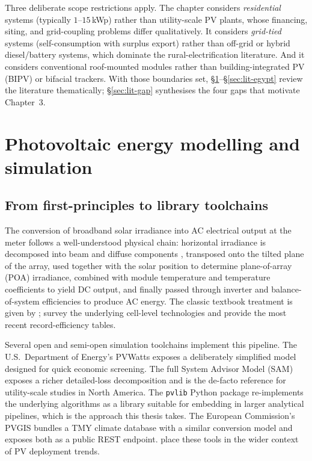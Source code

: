 Three deliberate scope restrictions apply. The chapter considers
\emph{residential} systems (typically $1$--$15$\,kWp) rather than
utility-scale PV plants, whose financing, siting, and grid-coupling
problems differ qualitatively. It considers \emph{grid-tied} systems
(self-consumption with surplus export) rather than off-grid or hybrid
diesel/battery systems, which dominate the rural-electrification
literature. And it considers conventional roof-mounted modules rather
than building-integrated PV (BIPV) or bifacial trackers. With those
boundaries set, \S\ref{sec:lit-pv}--\S\ref{sec:lit-egypt} review the
literature thematically; \S\ref{sec:lit-gap} synthesises the four
gaps that motivate Chapter~3.

\section{Photovoltaic energy modelling and simulation}
\label{sec:lit-pv}

\subsection{From first-principles to library toolchains}
\label{sec:lit-pv-tools}

The conversion of broadband solar irradiance into AC electrical
output at the meter follows a well-understood physical chain:
horizontal irradiance is decomposed into beam and diffuse components
\citep{liu1960}, transposed onto the tilted plane of the array, used
together with the solar position \citep{nrel-spa} to determine
plane-of-array (POA) irradiance, combined with module temperature and
temperature coefficients to yield DC output, and finally passed
through inverter and balance-of-system efficiencies to produce AC
energy. The classic textbook treatment is given by
\citet{duffie}; \citet{parida2011} survey the underlying cell-level
technologies and \citet{green2024} provide the most recent
record-efficiency tables.

Several open and semi-open simulation toolchains implement this
pipeline. The U.S.\ Department of Energy's PVWatts \citep{pvwatts2014}
exposes a deliberately simplified model designed for quick economic
screening. The full System Advisor Model (SAM) \citep{nrel-sam}
exposes a richer detailed-loss decomposition and is the de-facto
reference for utility-scale studies in North America. The
\texttt{pvlib} Python package \citep{pvlib} re-implements the
underlying algorithms as a library suitable for embedding in larger
analytical pipelines, which is the approach this thesis takes. The
European Commission's PVGIS \citep{pvgis} bundles a TMY climate
database with a similar conversion model and exposes both as a public
REST endpoint. \citet{ieapvps-task7} place these tools in the wider
context of PV deployment trends.

